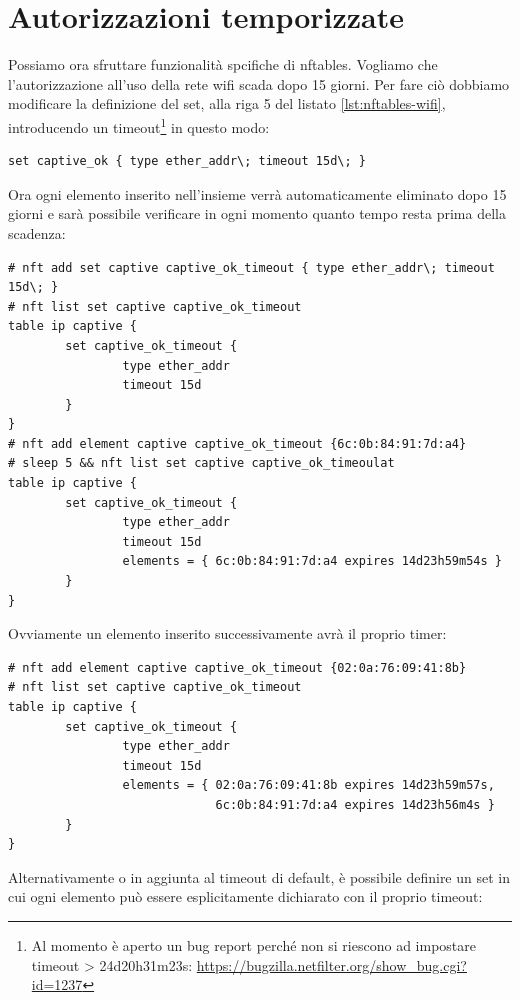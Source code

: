 \section{Autorizzazioni temporizzate}

Possiamo ora sfruttare funzionalità spcifiche di nftables.  Vogliamo che
l'autorizzazione all'uso della rete wifi scada dopo 15 giorni.  Per fare ciò
dobbiamo modificare la definizione del set, alla riga 5 del listato
\ref{lst:nftables-wifi}, introducendo un timeout\footnote{Al momento \`e aperto
un bug report perch\'e non si riescono ad impostare timeout > 24d20h31m23s:
\url{https://bugzilla.netfilter.org/show\_bug.cgi?id=1237}} in questo modo:
\begin{lstlisting}[style=customb]
set captive_ok { type ether_addr\; timeout 15d\; }
\end{lstlisting}
Ora ogni elemento inserito nell'insieme verrà automaticamente eliminato dopo 15
giorni e sarà possibile verificare in ogni momento quanto tempo resta prima
della scadenza:
\begin{lstlisting}[style=customb]
# nft add set captive captive_ok_timeout { type ether_addr\; timeout 15d\; }
# nft list set captive captive_ok_timeout
table ip captive {
        set captive_ok_timeout {
                type ether_addr
                timeout 15d
        }
}
# nft add element captive captive_ok_timeout {6c:0b:84:91:7d:a4}
# sleep 5 && nft list set captive captive_ok_timeoulat
table ip captive {
        set captive_ok_timeout {
                type ether_addr
                timeout 15d
                elements = { 6c:0b:84:91:7d:a4 expires 14d23h59m54s }
        }
}
\end{lstlisting}
Ovviamente un elemento inserito successivamente avrà il proprio timer:
\begin{lstlisting}[style=customb]
# nft add element captive captive_ok_timeout {02:0a:76:09:41:8b}
# nft list set captive captive_ok_timeout
table ip captive {
        set captive_ok_timeout {
                type ether_addr
                timeout 15d
                elements = { 02:0a:76:09:41:8b expires 14d23h59m57s,
                             6c:0b:84:91:7d:a4 expires 14d23h56m4s }
        }
}
\end{lstlisting}
Alternativamente o in aggiunta al timeout di default, è possibile definire un set in cui ogni elemento può essere esplicitamente dichiarato con il proprio timeout:
